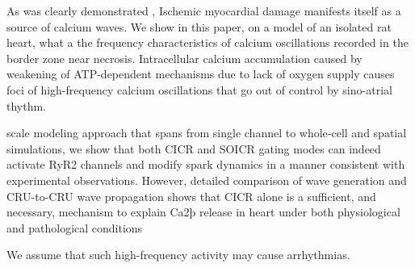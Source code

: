 \documentclass{biophys-new}
\begin{document}
As was clearly demonstrated \cite{matsuura2018intravital},
Ischemic myocardial damage manifests itself as a source of calcium waves.
We show in this paper, on a model of an isolated rat heart, what a the frequency characteristics of calcium oscillations recorded in the border zone near necrosis.
Intracellular calcium accumulation caused by weakening of ATP-dependent mechanisms due to lack of oxygen supply causes foci of high-frequency calcium oscillations that go out of control by sino-atrial thythm.

scale modeling approach that spans from single channel to whole-cell and spatial
simulations, we show that both CICR and SOICR gating modes can indeed activate RyR2 channels and modify  spark dynamics in a manner consistent
with experimental observations. However, detailed comparison of  wave
generation and CRU-to-CRU  wave propagation shows that CICR alone
is a sufficient, and necessary, mechanism to explain Ca2þ release in heart under
both physiological and pathological conditions
\cite{williams2017does}

We assume that such high-frequency activity may cause arrhythmias.
\end{document}
